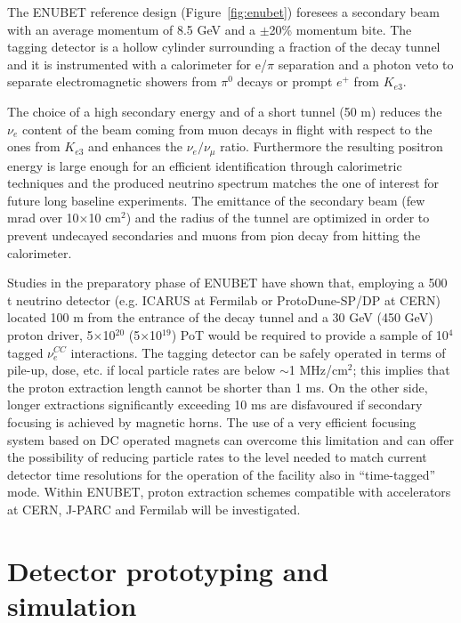 \documentclass[12pt]{article}
\begin{document}
The ENUBET reference design (Figure~\ref{fig:enubet}) foresees a secondary beam with an average momentum of 8.5 GeV and a
$\pm$20\% momentum bite.
The tagging detector is a hollow cylinder surrounding a fraction of the decay tunnel and it is instrumented with a
calorimeter for e/$\pi$ separation and a photon veto to separate electromagnetic showers from $\pi^0$ decays
or prompt $e^+$ from $K_{e3}$.

The choice of a high secondary energy and of a short tunnel (50 m) reduces the $\nu_{e}$ content of the beam coming from
muon decays in flight with respect to the ones from $K_{e3}$ and enhances the $\nu_{e}/\nu_{\mu}$ ratio.
Furthermore the resulting positron energy is large enough for an efficient identification through calorimetric techniques and
the produced neutrino spectrum matches the one of interest for future long baseline experiments.
The emittance of the secondary beam (few mrad over 10$\times$10 cm$^2$) and the radius of the tunnel are optimized in order to
prevent undecayed secondaries and muons from pion decay from hitting the calorimeter.

Studies in the preparatory phase of ENUBET have shown that, employing a 500 t neutrino detector (e.g. ICARUS at Fermilab
or ProtoDune-SP/DP at CERN) located 100 m from the entrance 
of the decay tunnel and a 30 GeV (450 GeV) proton driver, 5$\times$10$^{20}$ (5$\times$10$^{19}$)
PoT would be required to provide a sample of 10$^4$ tagged $\nu_{e}^{CC}$ interactions.
The tagging detector can be safely operated in terms of pile-up, dose, etc. if local particle rates are below $\sim$1 MHz/cm$^2$;
this implies that the proton ex\-traction length cannot be shorter than 1 ms. On the other side, longer extractions significantly exceeding
10 ms are disfavoured if secondary focusing is achieved by magnetic horns. The use of a very efficient focusing system based
on DC operated magnets can overcome this limitation and can offer the possibility of reducing particle rates to the level needed
to match current detector time resolutions for the operation of the facility also in ``time-tagged'' mode. Within ENUBET, proton
extraction schemes compatible with accelerators at CERN, J-PARC and Fermilab will be investigated.






\section{Detector prototyping and simulation}
\end{document}
